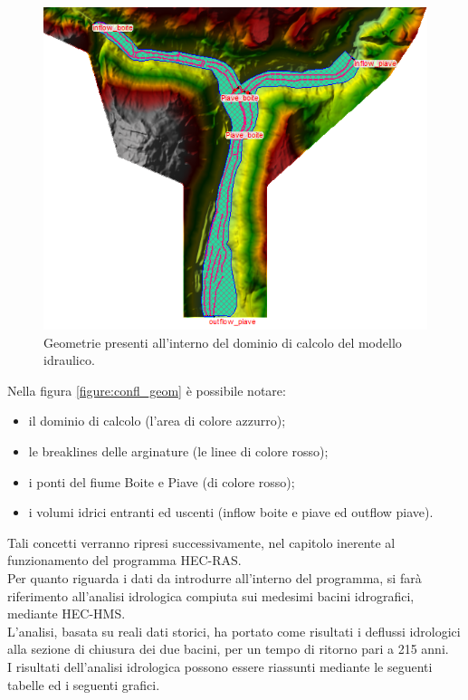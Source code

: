 \begin{figure}[htb] \centering
\includegraphics[scale=0.8]{immagini/confl_geom.PNG}
\caption{Geometrie presenti all'interno del dominio di calcolo del modello idraulico.}
\label{figure:confl_geom}    
\end{figure}
Nella figura \eqref{figure:confl_geom} è possibile notare:
\begin{itemize}
    \item il dominio di calcolo (l'area di colore azzurro);
    \item le breaklines delle arginature (le linee di colore rosso);
    \item i ponti del fiume Boite e Piave (di colore rosso);
    \item i volumi idrici entranti ed uscenti (inflow boite e piave ed outflow piave).
\end{itemize}
Tali concetti verranno ripresi successivamente, nel capitolo inerente al funzionamento del programma HEC-RAS.\\
Per quanto riguarda i dati da introdurre all'interno del programma, si farà riferimento all'analisi idrologica compiuta sui medesimi bacini idrografici, mediante HEC-HMS.\\
L'analisi, basata su reali dati storici, ha portato come risultati i deflussi idrologici alla sezione di chiusura dei due bacini, per un tempo di ritorno pari a 215 anni.\\
I risultati dell'analisi idrologica possono essere riassunti mediante le seguenti tabelle ed i seguenti grafici.

